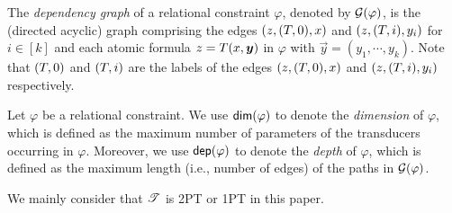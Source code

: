 The \emph{dependency graph} of a relational constraint $\varphi$, denoted by $\mathcal{G}(\varphi)$, is the (directed acyclic) graph comprising the edges $(z, (T, 0), x)$ and $(z, (T, i), y_i)$ for $i\in [k]$ and  each atomic formula $z = \Transducer(x, \vec{y})$ in $\varphi$ with $\vec{y}=(y_1, \cdots, y_k)$. Note that $(T, 0)$ and $(T, i)$ are the labels of the edges $(z, (T, 0), x)$ and $(z, (T, i), y_i)$ respectively.

Let $\varphi$ be a relational constraint. We use $\mathsf{dim}(\varphi)$ to denote the \emph{dimension} of $\varphi$, which is defined as the maximum number of parameters of the transducers occurring in $\varphi$. Moreover, we use $\mathsf{dep}(\varphi)$ to denote the \emph{depth} of $\varphi$, which is defined as the maximum length (i.e., number of edges) of the paths in $\mathcal{G}(\varphi)$.
 
We mainly consider that $\mathscr{T}$ is 2PT or 1PT in this paper. 
